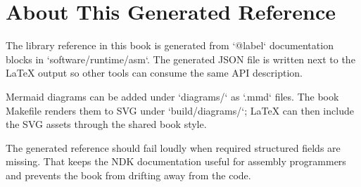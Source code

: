 \chapter*{About This Generated Reference}

The library reference in this book is generated from `@label` documentation
blocks in `software/runtime/asm`. The generated JSON file is written next to the LaTeX
output so other tools can consume the same API description.

Mermaid diagrams can be added under `diagrams/` as `.mmd` files. The book
Makefile renders them to SVG under `build/diagrams/`; LaTeX can then include
the SVG assets through the shared book style.

The generated reference should fail loudly when required structured fields are
missing. That keeps the NDK documentation useful for assembly programmers and
prevents the book from drifting away from the code.

